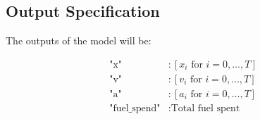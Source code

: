 \documentclass{article}
\begin{document}
\subsection*{Output Specification}

The outputs of the model will be:

\[
\begin{align*}
\text{"x"} &: [x_i \text{ for } i = 0, \ldots, T] \\
\text{"v"} &: [v_i \text{ for } i = 0, \ldots, T] \\
\text{"a"} &: [a_i \text{ for } i = 0, \ldots, T] \\
\text{"fuel\_spend"} &: \text{Total fuel spent}
\end{align*}
\]
\end{document}
